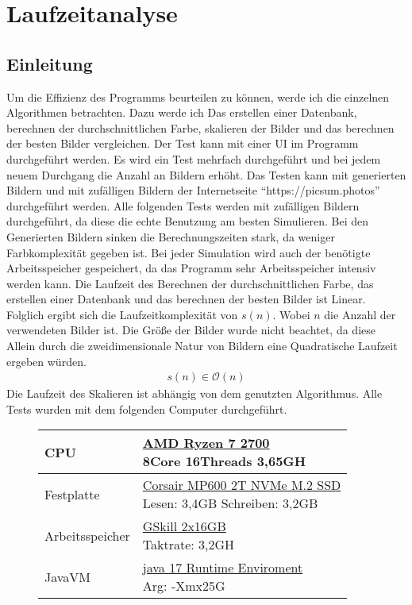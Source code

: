 \section{Laufzeitanalyse}
\subsection{Einleitung}
Um die Effizienz des Programms beurteilen zu können, werde ich die einzelnen Algorithmen betrachten. Dazu werde ich Das erstellen einer Datenbank, berechnen der durchschnittlichen Farbe, skalieren der Bilder und das berechnen der besten Bilder vergleichen. Der Test kann mit einer UI im Programm durchgeführt werden. Es wird ein Test mehrfach durchgeführt und bei jedem neuem Durchgang die Anzahl an Bildern erhöht. Das Testen kann mit generierten Bildern und mit zufälligen Bildern der Internetseite ``https://picsum.photos'' durchgeführt werden. Alle folgenden Tests werden mit zufälligen Bildern durchgeführt, da diese die echte Benutzung am besten Simulieren. Bei den Generierten Bildern sinken die Berechnungszeiten stark, da weniger Farbkomplexität gegeben ist. Bei jeder Simulation wird auch der benötigte Arbeitsspeicher gespeichert, da das Programm sehr Arbeitsspeicher intensiv werden kann. Die Laufzeit des Berechnen der durchschnittlichen Farbe, das erstellen einer Datenbank und das berechnen der besten Bilder ist Linear. Folglich ergibt sich die Laufzeitkomplexität von $s(n)$. Wobei $n$ die Anzahl der verwendeten Bilder ist. Die Größe der Bilder wurde nicht beachtet, da diese Allein durch die zweidimensionale Natur von Bildern eine Quadratische Laufzeit ergeben würden.
\begin{align}
    s(n) \in \mathcal{O}(n)
\end{align}
Die Laufzeit des Skalieren ist abhängig von dem genutzten Algorithmus.
\bigskip
\newline
Alle Tests wurden mit dem folgenden Computer durchgeführt.
\begin{figure}[h]
    \centering
    \begin{tabular}{| l | l |}
        \hline
        CPU             & \makecell[l]{\underline{AMD Ryzen 7 2700} \\ 8Core 16Threads 3,65GH}\\
        \hline
        Festplatte      & \makecell[l]{\underline{Corsair MP600 2T NVMe M.2 SSD} \\ Lesen: 3,4GB Schreiben: 3,2GB}\\
        \hline
        Arbeitsspeicher & \makecell[l]{\underline{GSkill 2x16GB} \\ Taktrate: 3,2GH}\\
        \hline
        JavaVM          & \makecell[l]{\underline{java 17 Runtime Enviroment} \\ Arg: -Xmx25G}\\
        \hline
    \end{tabular}
\end{figure}

